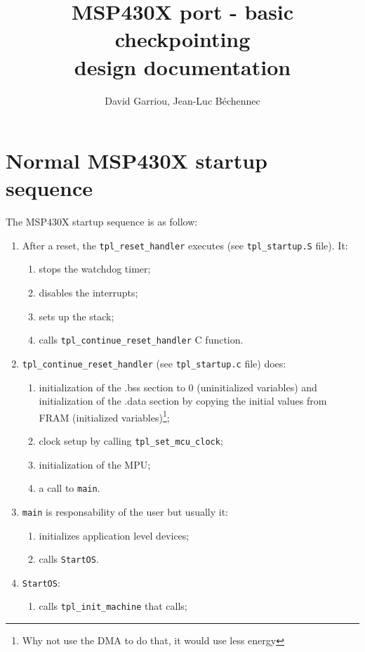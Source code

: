 \documentclass[11pt, oneside]{article}   	%
\title{MSP430X port - basic checkpointing\\design documentation}
\author{David Garriou, Jean-Luc Béchennec}
\begin{document}
\maketitle

\section{Normal MSP430X startup sequence}\label{sec:normalstart}

The MSP430X startup sequence is as follow:
\begin{enumerate}
\item After a reset, the \lstinline{tpl_reset_handler} executes (see \lstinline{tpl_startup.S} file). It:
	\begin{enumerate}
	\item stops the watchdog timer;
	\item disables the interrupts;
	\item sets up the stack;
	\item calls \lstinline{tpl_continue_reset_handler} C function.
	\end{enumerate}
\item \lstinline{tpl_continue_reset_handler} (see \lstinline{tpl_startup.c} file) does:
	\begin{enumerate}
	\item initialization of the .bss section to 0 (uninitialized variables) and initialization of the .data section by copying the initial values from FRAM (initialized variables)\label{item:bssdatainit}\footnote{Why not use the DMA to do that, it would use less energy};
	\item clock setup by calling \lstinline{tpl_set_mcu_clock}\label{item:clockinit};
	\item initialization of the MPU\label{item:mpuinit}; 
	\item a call to \lstinline{main}\label{item:callmain}.
	\end{enumerate}
\item \lstinline{main} is responsability of the user but usually it:
	\begin{enumerate}
	\item initializes application level devices;
	\item calls \lstinline{StartOS}.
	\end{enumerate}
\item \lstinline{StartOS}:
	\begin{enumerate}
	\item calls \lstinline{tpl_init_machine} that calls;

\end{enumerate}
\end{enumerate}
\end{document}
